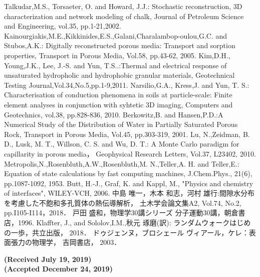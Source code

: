 \documentclass{jsce}
\begin{document}
\begin{thebibliography}{99}
\begin{spacing}{1.175}
	Talkudar,M.S., Torsaeter, O. and Howard, J.J.:
	Stochastic reconstruction, 3D characterization and network modeling of chalk, Journal of Petroleum Science and Engineering, 
	vol.35, pp.1-21,2002.
	Kainourgiakis,M.E.,Kikkinides,E.S.,Galani,Charalambop-oulou,G.C. and Stubos,A.K.:
	Digitally reconstructed porous media: Transport and sorption properties,
	Transport in Porous Media, Vol.58, pp.43-62, 2005.
	Kim,D.H., Young,J.K., Lee, J.-S. and Yun, T.S..:Thermal and electrical response of unsaturated hydropholic and hydrophobic granular materials,
	 Geotechnical Testing Journal,Vol.34,No.5,pp.1-9,2011.
	Narsilio,G.A., Kress,J. and Yun, T. S.:
	Characterisation of conduction phenomena in soils at particle-scale: 
	Finite element analyses in conjunction with syhtetic 3D imaging, Computers and Geotechnics, vol.38, pp.828-836, 2010.
        Berkowitz,B. and Hansen,P.D.:A Numerical Study of the Distribution of 	Water in Partially Saturated Porous Rock, 
	Transport in Porous Media, Vol.45, pp.303-319, 2001.
        Lu, N.,Zeidman, B. D., Lusk, M. T., Willson, C. S. and Wu, D. T.: 
	A Monte Carlo paradigm for capillarity in porous media， Geophysical Research Letters, Vol.37, L23402, 2010.
	Metropolis,N.,Rosenbluth,A.W.,Rosenbluth,M. N.,Teller,A. H. and	Teller,E.:
		Equation of state calculations by fast computing machines, 
	J.Chem.Phys., 21(6), pp.1087-1092, 1953.
	Butt, H.-J., Graf, K. and Kappl, M., 
	"Physics and chemistry of interfaces", WILEY-VCH, 2006.
	中島 唯一，木本 和志，河村 雄行:間隙水分布を考慮した不飽和多孔質体の熱伝導解析， 
	土木学会論文集A2, Vol.74, No.2, pp.I105-I114，2018．
	戸田 盛和，物理学30講シリーズ 分子運動30講，朝倉書店，1996.
	Klaffter, J., and Sololov,I.M.,秋元 琢磨(訳): 
	ランダムウォークはじめの一歩，共立出版， 2018．
ドゥジェンヌ，ブロシェール ヴィアール，ケレ：表面張力の物理学， 吉岡書店， 2003．
\end{spacing}
\end{thebibliography}
\vspace{-5mm}
\begin{flushright}
	\small
	\bf{ (Received July 19, 2019)\\
	(Accepted December 24, 2019)}
\end{flushright}
\newpage
\lastpagecontrol[1cm]{25.7cm}
\end{document}
